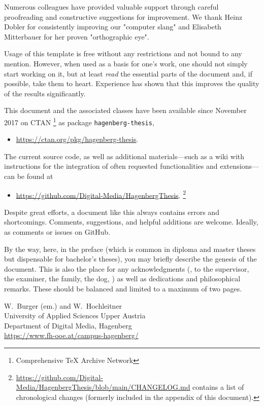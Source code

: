 Numerous colleagues have provided valuable support through careful proofreading
and constructive suggestions for improvement. We thank Heinz Dobler for
consistently improving our "computer slang" and Elisabeth Mitterbauer for her
proven "orthographic eye".

Usage of this template is free without any restrictions and not bound to any
mention. However, when used as a basis for one's work, one should not simply
start working on it, but at least \emph{read} the essential parts of the
document and, if possible, take them to heart. Experience has shown that this
improves the quality of the results significantly.

This document and the associated \latex classes have been available since
November 2017 on CTAN%
\footnote{Comprehensive TeX Archive Network} 
as package \texttt{hagenberg-thesis},
%
\begin{itemize}
	\item[]\url{https://ctan.org/pkg/hagenberg-thesis}.
\end{itemize}
%
The current source code, as well as additional materials---such as a wiki with
instructions for the integration of often requested functionalities and
extensions---can be found at
%
\begin{itemize}
  \item[]\url{https://github.com/Digital-Media/HagenbergThesis}.%
  \footnote{\url{https://github.com/Digital-Media/HagenbergThesis/blob/main/CHANGELOG.md}
  contains a list of chronological changes (formerly included in the appendix
  of this document).}
\end{itemize}

\noindent
Despite great efforts, a document like this always contains errors and
shortcomings. Comments, suggestions, and helpful additions are welcome.
Ideally, as comments or issues on GitHub.

By the way, here, in the preface (which is common in diploma and master theses
but dispensable for bachelor's theses), you may briefly describe the genesis of
the document. This is also the place for any acknowledgments (\eg, to the
supervisor, the examiner, the family, the dog, \etc) as well as dedications and
philosophical remarks. These should be balanced and limited to a maximum of two
pages.

\vspace{6ex}
\noindent
W.\ Burger (em.) and W.\ Hochleitner\\[1ex]
University of Applied Sciences Upper Austria\\ 
Department of Digital Media, Hagenberg\\
\url{https://www.fh-ooe.at/campus-hagenberg/}



